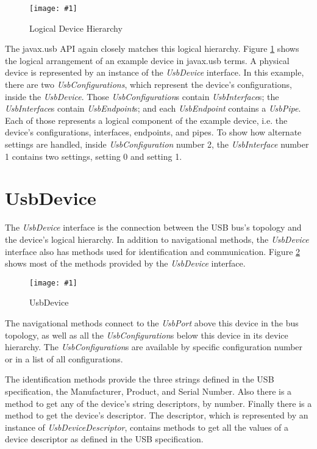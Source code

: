 \documentclass{article}
\newcommand{\myinterface}[1]{\emph{#1}}
\newcommand{\mysectionend}[0]{\vfill\pagebreak[1]}
\newcommand{\myfigure}[3]{\begin{figure}[htbp]\centering\texttt{[image: \#1]}\caption{#2}\label{#3}\end{figure}}
\begin{document}
\myfigure{figs/logical_device_hierarchy}{Logical Device Hierarchy}{device_hierarchy}

The javax.usb API again closely matches this logical hierarchy.  Figure \ref{device_hierarchy}
shows the logical arrangement of an example device in javax.usb terms.  A physical
device is represented by an instance of the \myinterface{UsbDevice} interface.  In this example,
there are two \myinterface{UsbConfigurations}, which represent the device's configurations,
inside the \myinterface{UsbDevice}.  Those \myinterface{UsbConfiguration}s
contain \myinterface{UsbInterface}s; the \myinterface{UsbInterface}s
contain \myinterface{UsbEndpoint}s; and each \myinterface{UsbEndpoint}
contains a \myinterface{UsbPipe}.  Each of those represents a logical component
of the example device, i.e. the device's configurations, interfaces, endpoints,
and pipes.  To show how alternate settings are handled, inside \myinterface{UsbConfiguration}
number 2, the \myinterface{UsbInterface} number 1 contains two settings, setting 0 and setting 1.

\mysectionend

%

\section{UsbDevice}

The \myinterface{UsbDevice} interface is the connection between the USB bus's
topology and the device's logical hierarchy.  In addition to
navigational methods, the \myinterface{UsbDevice} interface also has methods
used for identification and communication.  Figure \ref{UsbDevice}
shows most of the methods provided by the \myinterface{UsbDevice} interface.

\myfigure{figs/UsbDevice}{UsbDevice}{UsbDevice}

The navigational methods connect to the \myinterface{UsbPort} above this
device in the bus topology, as well as all the \myinterface{UsbConfiguration}s
below this device in its device hierarchy.  The \myinterface{UsbConfiguration}s
are available by specific configuration number or in a list of
all configurations.

The identification methods provide the three strings defined in
the USB specification, the Manufacturer, Product, and Serial Number.
Also there is a method to get any of the device's string descriptors,
by number.  Finally there is a method to get the device's descriptor.
The descriptor, which is represented by an instance of \myinterface{UsbDeviceDescriptor},
contains methods to get all the values of a device descriptor as
defined in the USB specification.
\end{document}
